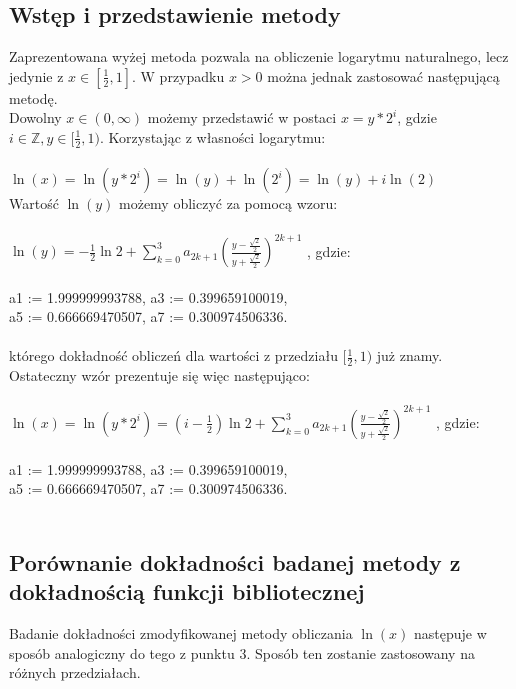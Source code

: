 \documentclass[10pt]{article}
\begin{document}
\subsection{Wstęp i przedstawienie metody}
Zaprezentowana wyżej metoda pozwala na obliczenie logarytmu naturalnego, lecz jedynie z $x \in [\frac{1}{2},1]$. W przypadku $x>0$ można jednak zastosować następującą metodę. \\
Dowolny $x \in (0,\infty)$ możemy przedstawić w postaci $x = y * 2^{i}$, gdzie $i \in \mathbb{Z}, y \in [\frac{1}{2},1)$. Korzystając z własności logarytmu:\\
\\
$\ln(x) = \ln(y*2^{i}) = \ln(y) + \ln(2^{i}) = \ln(y) + i\ln(2)$\\
Wartość $\ln(y)$ możemy obliczyć za pomocą wzoru: \\
\\
\begin{math}
\ln(y) = -\frac{1}{2} \ln2 + \sum_{k=0}^{3} a_{2k+1} \left(\frac{y - \frac{\sqrt{2}}{2}}{y + \frac{\sqrt{2}}{2}} \right)^{2k+1}
\end{math} , gdzie: \\
\\
a1 := 1.999999993788, \hspace{1.5cm} a3 := 0.399659100019, \\
a5 := 0.666669470507, \hspace{1.5cm} a7 := 0.300974506336. \\
\\
którego dokładność obliczeń dla wartości z przedziału $[\frac{1}{2},1)$ już znamy. Ostateczny wzór prezentuje się więc następująco: \\
\\
\begin{math}
\ln(x) = \ln(y*2^{i}) = (i -\frac{1}{2}) \ln2 + \sum_{k=0}^{3} a_{2k+1} \left(\frac{y - \frac{\sqrt{2}}{2}}{y + \frac{\sqrt{2}}{2}} \right)^{2k+1}
\end{math} , gdzie: \\
\\
a1 := 1.999999993788, \hspace{1.5cm} a3 := 0.399659100019, \\
a5 := 0.666669470507, \hspace{1.5cm} a7 := 0.300974506336. \\
\\


\subsection{Porównanie dokładności badanej metody z dokładnością funkcji bibliotecznej}
Badanie dokładności zmodyfikowanej metody obliczania $\ln(x)$ następuje w sposób analogiczny do tego z punktu 3. Sposób ten zostanie zastosowany na różnych przedziałach.
\end{document}
